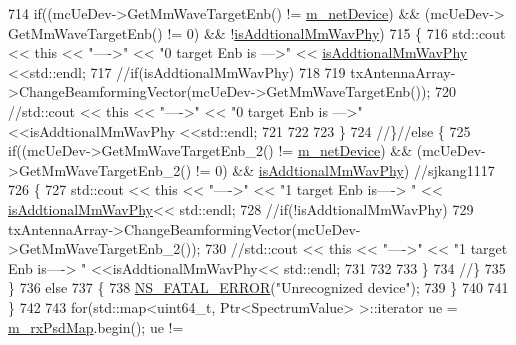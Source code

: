 \begin{DoxyCode}
714                         \textcolor{keywordflow}{if}((mcUeDev->GetMmWaveTargetEnb() != \hyperlink{classns3_1_1MmWavePhy_a0f14f4e8f7539b06497ba321d9df344c}{m\_netDevice}) && (mcUeDev->
      GetMmWaveTargetEnb() != 0) && !\hyperlink{classns3_1_1MmWaveEnbPhy_a1a171ed81b1efedf963000d89f2cbd98}{isAddtionalMmWavPhy})
715                         \{
716                                 std::cout << \textcolor{keyword}{this} << \textcolor{stringliteral}{"---->"} << \textcolor{stringliteral}{"0 target Enb is --->"} <<
      \hyperlink{classns3_1_1MmWaveEnbPhy_a1a171ed81b1efedf963000d89f2cbd98}{isAddtionalMmWavPhy} <<std::endl;
717                                 \textcolor{comment}{//if(isAddtionalMmWavPhy)}
718 
719                                 txAntennaArray->ChangeBeamformingVector(mcUeDev->GetMmWaveTargetEnb());
720                                 \textcolor{comment}{//std::cout << this << "---->" << "0 target Enb is --->"
       <<isAddtionalMmWavPhy <<std::endl;}
721 
722 
723                         \}
724                         \textcolor{comment}{//\}//else \{}
725                                 \textcolor{keywordflow}{if}((mcUeDev->GetMmWaveTargetEnb\_2() != 
      \hyperlink{classns3_1_1MmWavePhy_a0f14f4e8f7539b06497ba321d9df344c}{m\_netDevice}) && (mcUeDev->GetMmWaveTargetEnb\_2() != 0) && 
      \hyperlink{classns3_1_1MmWaveEnbPhy_a1a171ed81b1efedf963000d89f2cbd98}{isAddtionalMmWavPhy}) \textcolor{comment}{//sjkang1117}
726                         \{
727                                 std::cout << \textcolor{keyword}{this} << \textcolor{stringliteral}{"---->"} << \textcolor{stringliteral}{"1 target Enb is----> "} <<
      \hyperlink{classns3_1_1MmWaveEnbPhy_a1a171ed81b1efedf963000d89f2cbd98}{isAddtionalMmWavPhy}<< std::endl;
728                                 \textcolor{comment}{//if(!isAddtionalMmWavPhy)}
729                                 txAntennaArray->ChangeBeamformingVector(mcUeDev->GetMmWaveTargetEnb\_2());
730                                 \textcolor{comment}{//std::cout << this << "---->" << "1 target Enb is----> "
       <<isAddtionalMmWavPhy<< std::endl;}
731 
732 
733                         \}
734                         \textcolor{comment}{//\}}
735                 \}
736                 \textcolor{keywordflow}{else}
737                 \{
738                         \hyperlink{group__fatal_ga5131d5e3f75d7d4cbfd706ac456fdc85}{NS\_FATAL\_ERROR}(\textcolor{stringliteral}{"Unrecognized device"});
739                 \}
740 
741         \}
742 
743         \textcolor{keywordflow}{for}(std::map<uint64\_t, Ptr<SpectrumValue> >::iterator ue = \hyperlink{classns3_1_1MmWaveEnbPhy_a40b3813d00f430aed47e1ee084df4d78}{m\_rxPsdMap}.begin(); ue != 

\end{DoxyCode}
